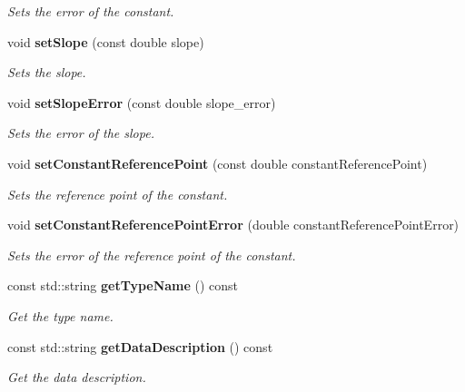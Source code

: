 \begin{DoxyCompactItemize}
\begin{DoxyCompactList}\small\item\em Sets the error of the constant. \end{DoxyCompactList}\item 
void {\bf set\-Slope} (const double slope)\label{classCALICE_1_1LinearFitCompound_afed1ff8b17afcaee84727a41ace77349}

\begin{DoxyCompactList}\small\item\em Sets the slope. \end{DoxyCompactList}\item 
void {\bf set\-Slope\-Error} (const double slope\-\_\-error)\label{classCALICE_1_1LinearFitCompound_af8761b938e369b0daaa1ec258db93a7e}

\begin{DoxyCompactList}\small\item\em Sets the error of the slope. \end{DoxyCompactList}\item 
void {\bf set\-Constant\-Reference\-Point} (const double constant\-Reference\-Point)\label{classCALICE_1_1LinearFitCompound_a9f694715ade079c8e0e8af5496707e37}

\begin{DoxyCompactList}\small\item\em Sets the reference point of the constant. \end{DoxyCompactList}\item 
void {\bf set\-Constant\-Reference\-Point\-Error} (double constant\-Reference\-Point\-Error)\label{classCALICE_1_1LinearFitCompound_a0e2c5570c83bbb2e3f3a0e9124258d4f}

\begin{DoxyCompactList}\small\item\em Sets the error of the reference point of the constant. \end{DoxyCompactList}\item 
const std\-::string {\bf get\-Type\-Name} () const 
\begin{DoxyCompactList}\small\item\em Get the type name. \end{DoxyCompactList}\item 
const std\-::string {\bf get\-Data\-Description} () const 
\begin{DoxyCompactList}\small\item\em Get the data description. \end{DoxyCompactList}\end{DoxyCompactItemize}


